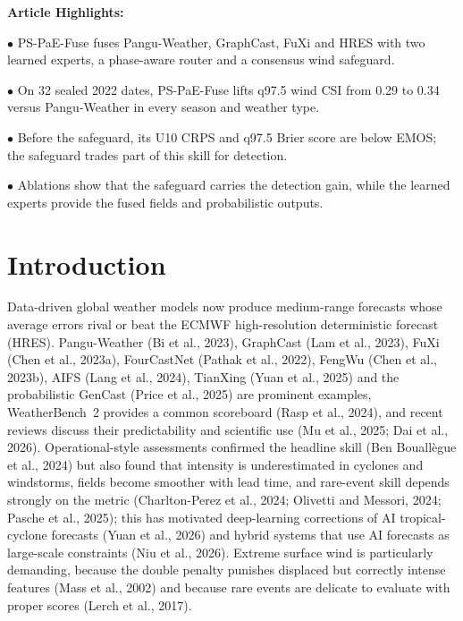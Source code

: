 \documentclass[12pt]{article}
\begin{document}
\vspace*{-10mm}


\vspace*{1mm}

\noindent
{\bf Article Highlights:}

\noindent$\bullet$
PS-PaE-Fuse fuses Pangu-Weather, GraphCast, FuXi and HRES with two learned experts, a phase-aware router and a consensus wind safeguard.

\noindent$\bullet$
On 32 sealed 2022 dates, PS-PaE-Fuse lifts q97.5 wind CSI from 0.29 to 0.34 versus Pangu-Weather in every season and weather type.

\noindent$\bullet$
Before the safeguard, its U10 CRPS and q97.5 Brier score are below EMOS; the safeguard trades part of this skill for detection.

\noindent$\bullet$
Ablations show that the safeguard carries the detection gain, while the learned experts provide the fused fields and probabilistic outputs.

\section{Introduction}
\label{sec:intro}

Data-driven global weather models now produce medium-range forecasts whose average errors rival or beat the ECMWF high-resolution deterministic forecast (HRES). Pangu-Weather (Bi et al., 2023), GraphCast (Lam et al., 2023), FuXi (Chen et al., 2023a), FourCastNet (Pathak et al., 2022), FengWu (Chen et al., 2023b), AIFS (Lang et al., 2024), TianXing (Yuan et al., 2025) and the probabilistic GenCast (Price et al., 2025) are prominent examples, WeatherBench~2 provides a common scoreboard (Rasp et al., 2024), and recent reviews discuss their predictability and scientific use (Mu et al., 2025; Dai et al., 2026). Operational-style assessments confirmed the headline skill (Ben Bouall\`egue et al., 2024) but also found that intensity is underestimated in cyclones and windstorms, fields become smoother with lead time, and rare-event skill depends strongly on the metric (Charlton-Perez et al., 2024; Olivetti and Messori, 2024; Pasche et al., 2025); this has motivated deep-learning corrections of AI tropical-cyclone forecasts (Yuan et al., 2026) and hybrid systems that use AI forecasts as large-scale constraints (Niu et al., 2026). Extreme surface wind is particularly demanding, because the double penalty punishes displaced but correctly intense features (Mass et al., 2002) and because rare events are delicate to evaluate with proper scores (Lerch et al., 2017).
\end{document}
